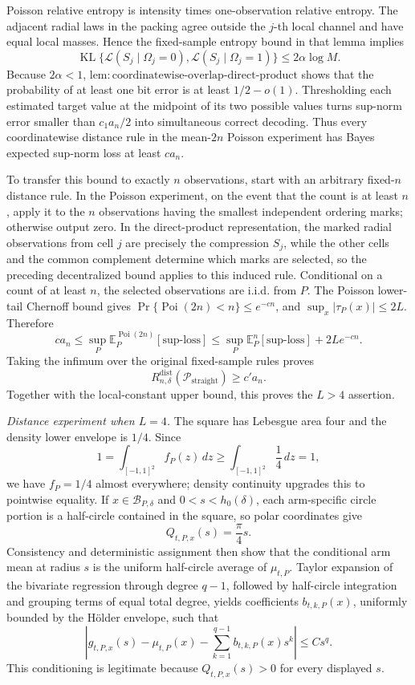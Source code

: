Poisson relative entropy is intensity times one-observation relative entropy.  The adjacent radial laws in the packing agree outside the \(j\)-th local channel and have equal local masses.  Hence the fixed-sample entropy bound in that lemma implies
\[
 \operatorname{KL}\{\mathcal L(S_j\mid\Omega_j=0),
 \mathcal L(S_j\mid\Omega_j=1)\}
 \leq2\alpha\log M.
\]
Because \(2\alpha<1\), \(\mathrm{lem:coordinatewise\text{-}overlap\text{-}direct\text{-}product}\) shows that the probability of at least one bit error is at least \(1/2-o(1)\).  Thresholding each estimated target value at the midpoint of its two possible values turns sup-norm error smaller than \(c_1a_n/2\) into simultaneous correct decoding.  Thus every coordinatewise distance rule in the mean-\(2n\) Poisson experiment has Bayes expected sup-norm loss at least \(c a_n\).

To transfer this bound to exactly \(n\) observations, start with an arbitrary fixed-\(n\) distance rule.  In the Poisson experiment, on the event that the count is at least \(n\), apply it to the \(n\) observations having the smallest independent ordering marks; otherwise output zero.  In the direct-product representation, the marked radial observations from cell \(j\) are precisely the compression \(S_j\), while the other cells and the common complement determine which marks are selected, so the preceding decentralized bound applies to this induced rule.  Conditional on a count of at least \(n\), the selected observations are i.i.d. from \(P\).  The Poisson lower-tail Chernoff bound gives \(\Pr\{\operatorname{Poi}(2n)<n\}\leq e^{-cn}\), and \(\sup_x|\tau_P(x)|\leq2L\).  Therefore
\[
 c a_n\leq
 \sup_P\mathbb E_P^{\operatorname{Poi}(2n)}[\text{sup-loss}]
 \leq\sup_P\mathbb E_P^{n}[\text{sup-loss}]+2Le^{-cn}.
\]
Taking the infimum over the original fixed-sample rules proves
\[
 R_{n,\delta}^{\mathrm{dist}}(\mathcal P_{\mathrm{straight}})\geq c'a_n.
\]
Together with the local-constant upper bound, this proves the \(L>4\) assertion.

\emph{Distance experiment when \(L=4\).}
The square has Lebesgue area four and the density lower envelope is \(1/4\).  Since
\[
 1=\int_{[-1,1]^2}f_P(z)\,dz\geq\int_{[-1,1]^2}\frac14\,dz=1,
\]
we have \(f_P=1/4\) almost everywhere; density continuity upgrades this to pointwise equality.  If \(x\in\mathcal B_{P,\delta}\) and \(0<s<h_0(\delta)\), each arm-specific circle portion is a half-circle contained in the square, so polar coordinates give
\[
 Q_{t,P,x}(s)=\frac\pi4s.
\]
Consistency and deterministic assignment then show that the conditional arm mean at radius \(s\) is the uniform half-circle average of \(\mu_{t,P}\).  Taylor expansion of the bivariate regression through degree \(q-1\), followed by half-circle integration and grouping terms of equal total degree, yields coefficients \(b_{t,k,P}(x)\), uniformly bounded by the H\"older envelope, such that
\[
 \left|g_{t,P,x}(s)-\mu_{t,P}(x)
 -\sum_{k=1}^{q-1}b_{t,k,P}(x)s^k\right|\leq Cs^q.
\]
This conditioning is legitimate because \(Q_{t,P,x}(s)>0\) for every displayed \(s\).

